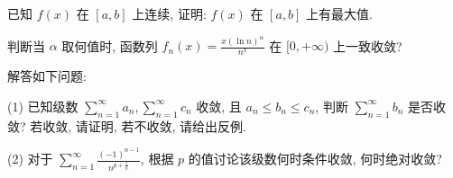 已知 $f(x)$ 在 $[a, b]$ 上连续, 证明: $f(x)$ 在 $[a, b]$ 上有最大值.\par
判断当 $\alpha$ 取何值时, 函数列 $f_{n}(x) = \frac{x(\ln n)^{\alpha}}{n^{x}}$ 在 $[0, +\infty)$ 上一致收敛?\par
解答如下问题:\par
(1) 已知级数 $\sum_{n=1}^{\infty} a_n, \sum_{n=1}^{\infty} c_n$ 收敛, 且 $a_n \leq b_n \leq c_n$, 判断 $\sum_{n=1}^{\infty} b_n$ 是否收敛? 若收敛, 请证明, 若不收敛, 请给出反例.\par
(2) 对于 $\sum_{n=1}^{\infty} \frac{(-1)^{n-1}}{n^{p+\frac{1}{n}}}$, 根据 $p$ 的值讨论该级数何时条件收敛, 何时绝对收敛?\par
